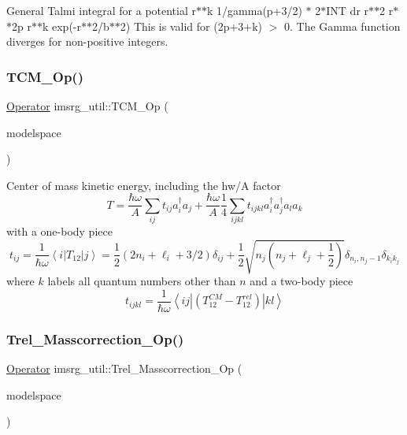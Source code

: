 General Talmi integral for a potential r$\ast$$\ast$k 1/gamma(p+3/2) $\ast$ 2$\ast$\+I\+NT dr r$\ast$$\ast$2 r$\ast$$\ast$2p r$\ast$$\ast$k exp(-\/r$\ast$$\ast$2/b$\ast$$\ast$2) This is valid for (2p+3+k) $>$ 0. The Gamma function diverges for non-\/positive integers. \mbox{\label{namespaceimsrg__util_a9b3d4919bee84bfc3887cddb802ea643}} 
\subsubsection{\texorpdfstring{T\+C\+M\+\_\+\+Op()}{TCM\_Op()}}
{\footnotesize\ttfamily \hyperlink{classOperator}{Operator} imsrg\+\_\+util\+::\+T\+C\+M\+\_\+\+Op (\begin{DoxyParamCaption}\item[{\hyperlink{classModelSpace}{Model\+Space} \&}]{modelspace }\end{DoxyParamCaption})}

Center of mass kinetic energy, including the hw/A factor \[ T = \frac{\hbar\omega}{A}\sum_{ij} t_{ij} a^{\dagger}_{i} a_{j} + \frac{\hbar\omega}{A}\frac{1}{4}\sum_{ijkl} t_{ijkl} a^{\dagger}_{i}a^{\dagger}_{j}a_{l}a_{k} \] with a one-\/body piece \[ t_{ij} = \frac{1}{\hbar\omega} \left\langle i | T_{12} | j \right\rangle = \frac{1}{2}(2n_i+\ell_i+3/2) \delta_{ij} + \frac{1}{2}\sqrt{n_j(n_j+\ell_j+\frac{1}{2})} \delta_{n_i,n_j-1}\delta_{k_i k_j} \] where $k$ labels all quantum numbers other than $n$ and a two-\/body piece \[ t_{ijkl} = \frac{1}{\hbar\omega} \left\langle ij | (T^{CM}_{12} - T^{rel}_{12}) | kl \right\rangle \] \mbox{\label{namespaceimsrg__util_ad98bde55827adc03ecbca03925e3f65a}} 
\subsubsection{\texorpdfstring{Trel\+\_\+\+Masscorrection\+\_\+\+Op()}{Trel\_Masscorrection\_Op()}}
{\footnotesize\ttfamily \hyperlink{classOperator}{Operator} imsrg\+\_\+util\+::\+Trel\+\_\+\+Masscorrection\+\_\+\+Op (\begin{DoxyParamCaption}\item[{\hyperlink{classModelSpace}{Model\+Space} \&}]{modelspace }\end{DoxyParamCaption})}

